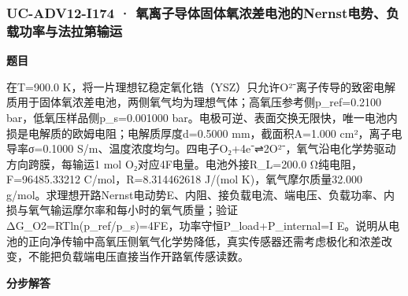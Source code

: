 \documentclass[UTF8,11pt,a4paper]{ctexart}
\begin{document}
\subsubsection*{UC-ADV12-I174 · 氧离子导体固体氧浓差电池的Nernst电势、负载功率与法拉第输运}
\noindent\textbf{题目}\par
在T=900.0 K，将一片理想钇稳定氧化锆（YSZ）只允许O²⁻离子传导的致密电解质用于固体氧浓差电池，两侧氧气均为理想气体；高氧压参考侧p\_ref=0.2100 bar，低氧压样品侧p\_s=0.001000 bar。电极可逆、表面交换无限快，唯一电池内损是电解质的欧姆电阻；电解质厚度d=0.5000 mm，截面积A=1.000 cm²，离子电导率σ=0.1000 S/m、温度浓度均匀。四电子O₂+4e⁻⇌2O²⁻，氧气沿电化学势驱动方向跨膜，每输运1 mol O₂对应4F电量。电池外接R\_L=200.0 Ω纯电阻，F=96485.33212 C/mol，R=8.314462618 J/(mol K)，氧气摩尔质量32.000 g/mol。求理想开路Nernst电动势E、内阻、接负载电流、端电压、负载功率、内损与氧气输运摩尔率和每小时的氧气质量；验证ΔG\_O2=RTln(p\_ref/p\_s)=4FE，功率守恒P\_load+P\_internal=I E。说明从电池的正向净传输中高氧压侧氧气化学势降低，真实传感器还需考虑极化和浓差改变，不能把负载端电压直接当作开路氧传感读数。\par
\medskip\noindent\textbf{分步解答}
\end{document}
